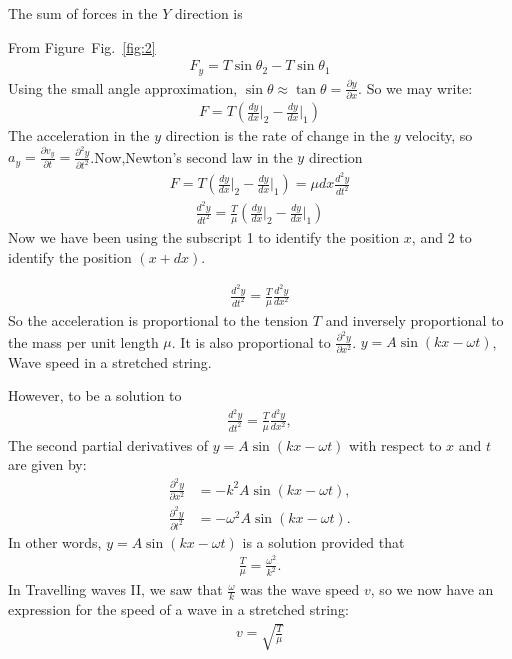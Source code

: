 \documentclass[journal,12pt,twocolumn]{IEEEtran}
\newcommand\figref{Fig.~\ref}
\theoremstyle{remark}
\begin{document}
The sum of forces in the $Y$ direction is

From Figure~\figref{fig:2}
\begin{align}
F_y = T \sin \theta_2 - T \sin \theta_1 
\end{align}
Using the small angle approximation, $\sin \theta \approx \tan \theta = \frac{\partial y}{\partial x}$. So we may write:
\begin{align}
 F = T\left(\frac{dy}{dx}\Big|_2 - \frac{dy}{dx}\Big|_1\right) 
\end{align}
The acceleration in the $y$ direction is the rate of change in the $y$ velocity, so $a_y = \frac{\partial v_y}{\partial t} = \frac{\partial^2 y}{\partial t^2}$.Now,Newton’s second law in the $y$ direction
\begin{align}
 F = T\left(\frac{dy}{dx}\Big|_2 - \frac{dy}{dx}\Big|_1\right) = \mu dx \frac{d^2y}{dt^2} 
\end{align}
\begin{align}
 \frac{d^2y}{dt^2} = \frac{T}{\mu} \left(\frac{dy}{dx}\Big|_2 - \frac{dy}{dx}\Big|_1\right) 
\end{align}
Now we have been using the subscript 1 to identify the position $x$, and 2 to identify the position $(x+dx)$.
 
\begin{align}
 \frac{d^2y}{dt^2} = \frac{T}{\mu} \frac{d^2y}{dx^2} 
\end{align}
So the acceleration is proportional to the tension $T$ and inversely proportional to the mass per unit length $\mu$. 
It is also proportional to $\frac{\partial^2y}{\partial x^2}$.  $y = A \sin(kx - \omega t)$, Wave speed in a stretched string.

 However, to be a solution to 
\begin{align}
 \frac{d^2y}{dt^2} = \frac{T}{\mu} \frac{d^2y}{dx^2}, 
\end{align}
The second partial derivatives of $y = A\sin(kx - \omega t)$ with respect to $x$ and $t$ are given by:
\begin{align}
\frac{\partial^2 y}{\partial x^2} &= -k^2 A \sin(kx - \omega t), \\
\frac{\partial^2 y}{\partial t^2} &= -\omega^2 A \sin(kx - \omega t).
\end{align} In other words, $y = A \sin(kx - \omega t)$ is a solution provided that
\begin{align}
 \frac{T}{\mu} = \frac{\omega^2}{k^2}. 
\end{align}
In Travelling waves II, we saw that $\frac{\omega}{k}$ was the wave speed $v$, so we now have an expression for the speed of a wave in a stretched string:
\begin{align}
 v = \sqrt{\frac{T}{\mu}} 
\end{align}
\end{document}
